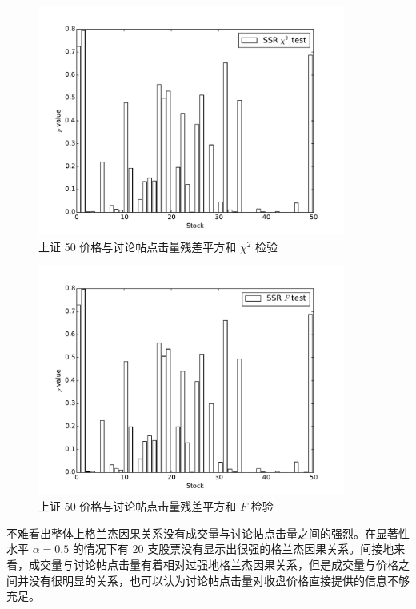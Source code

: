 \begin{figure}
  \centering
  \includegraphics[width=0.9\textwidth]{plots/price_click_count_granger_on_sse_50_ssr_chi2test.pdf}
  \caption{上证 50 价格与讨论帖点击量残差平方和 $\chi^{2}$ 检验}
  \label{price_click_count:5}
\end{figure}

\begin{figure}
  \centering
  \includegraphics[width=0.9\textwidth]{plots/price_click_count_granger_on_sse_50_ssr_ftest.pdf}
  \caption{上证 50 价格与讨论帖点击量残差平方和 $F$ 检验}
  \label{price_click_count:6}
\end{figure}

不难看出整体上格兰杰因果关系没有成交量与讨论帖点击量之间的强烈。在显著性水平 $\alpha=0.5$ 的情况下有 $20$ 支股票没有显示出很强的格兰杰因果关系。间接地来看，成交量与讨论帖点击量有着相对过强地格兰杰因果关系，但是成交量与价格之间并没有很明显的关系，也可以认为讨论帖点击量对收盘价格直接提供的信息不够充足。

